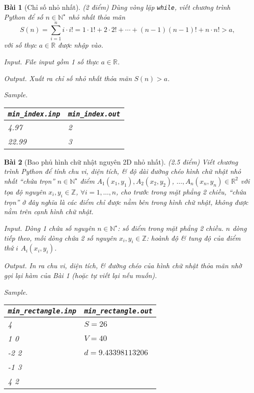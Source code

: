 \documentclass{article}
\newtheorem{baitoan}{Bài}
\begin{document}
\begin{baitoan}[Chỉ số nhỏ nhất]
	{\rm(2 điểm)} Dùng vòng lặp {\tt while}, viết chương trình Python để số $n\in\mathbb{N}^\star$ nhỏ nhất thỏa mãn
	\begin{equation*}
		S(n) = \sum_{i=1}^n i\cdot i! = 1\cdot1! + 2\cdot2! + \cdots + (n - 1)(n - 1)! + n\cdot n! > a,
	\end{equation*}
	với số thực $a\in\mathbb{R}$ được nhập vào.
	\item {\sf Input.} File input gồm 1 số thực $a\in\mathbb{R}$.
	\item {\sf Output.} Xuất ra chỉ số nhỏ nhất thỏa mãn $S(n) > a$.
	\item {\sf Sample.}
	\begin{table}[H]
		\centering
		\begin{tabular}{|l|l|}
			\hline
			\verb|min_index.inp| & \verb|min_index.out| \\
			\hline
			4.97 & 2 \\
			22.99 & 3 \\
			\hline
		\end{tabular}
	\end{table}
\end{baitoan}

\begin{baitoan}[Bao phủ hình chữ nhật nguyên 2D nhỏ nhất]
	{\rm(2.5 điểm)} Viết chương trình Python để tính chu vi, diện tích, \& độ dài đường chéo hình chữ nhật nhỏ nhất ``chứa trọn'' $n\in\mathbb{N}^\star$ điểm $A_1(x_1,y_1),A_2(x_2,y_2)$, $\ldots,A_n(x_n,y_n)\in\mathbb{R}^2$ với tọa độ nguyên $x_i,y_i\in\mathbb{Z}$, $\forall i = 1,\ldots,n$, cho trước trong mặt phẳng 2 chiều, ``chứa trọn'' ở đây nghĩa là các điểm chỉ được nằm bên trong hình chữ nhật, không được nằm trên cạnh hình chữ nhật.
	\item {\sf Input.} Dòng 1 chứa số nguyên $n\in\mathbb{N}^\star$: số điểm trong mặt phẳng 2 chiều. $n$ dòng tiếp theo, mỗi dòng chứa 2 số nguyên $x_i,y_i\in\mathbb{Z}$: hoành độ \& tung độ của điểm thứ $i$ $A_i(x_i,y_i)$.
	\item {\sf Output.} In ra chu vi, diện tích, \& đường chéo của hình chữ nhật thỏa mãn nhờ gọi lại hàm của Bài 1 (hoặc tự viết lại nếu muốn).
	\item {\sf Sample.}
	\begin{table}[H]
		\centering
		\begin{tabular}{|l|l|}
			\hline
			\verb|min_rectangle.inp| & \verb|min_rectangle.out| \\
			\hline
			4 & $S = 26$ \\
			1 0 & $V = 40$ \\
			-2 2 & $d = 9.43398113206$ \\
			-1 3 & \\
			4 2 & \\
			\hline
		\end{tabular}
	\end{table}
\end{baitoan}
\end{document}
